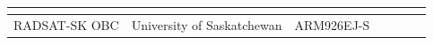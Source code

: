 \documentclass[10pt]{../datasheet}
\let\cite\citep
\begin{document}
\begin{landscape}
\begin{longtable}{|p{2.6cm}|p{2.0cm}|p{3.8cm}|p{3.8cm}|p{1.4cm}|p{6.4cm}|p{1.0cm}|}
    \cite{neudose_obc_pub}                                                                                                                                                                                                                                                                                                                                                                    \\ \hline
    RADSAT-SK OBC                                                                                                                                                                                                                                                                     &
    University of Saskatchewan                                                                                                                                                                                                                                                        &
    ARM926EJ-S                                                                                                                                                                                                                                                                        &
                                                                                                                                                                                                                                                                                      &
                                                                                                                                                                                                                                                                                      &
    \cite{radsat_sk_obc_git}                                                                                                                                                                                                                                                                                                                                                                  \\ \hline
  \end{longtable}
\end{landscape}
\clearpage
\end{document}

